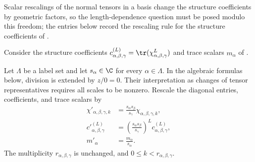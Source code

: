 Scalar rescalings of the normal tensors in a basis change the structure
coefficients by geometric factors, so the length-dependence question
must be posed modulo this freedom; the entries below record the
rescaling rule for the structure coefficients of
\cite[Theorem~4.14]{Cirac2016MPDO_arXiv}.

Consider the structure coefficients
$c_{\alpha,\beta,\gamma}^{(L)}=\tr(\chi_{\alpha,\beta,\gamma}^{L})$
and trace scalars $m_\alpha$ of
\cite[Theorem~4.14(ii)]{Cirac2016MPDO_arXiv}.
\begin{definition}
    \label{def:asymex_rescaling}
    \leanok
    Let $\Lambda$ be a label set and let $s_\alpha\in\C$
    for every $\alpha\in\Lambda$. In the algebraic formulas below,
    division is extended by $z/0=0$. Their interpretation as changes
    of tensor representatives requires all scales to be nonzero.
    Rescale the diagonal entries, coefficients, and trace scalars by
    \begin{align}
        \chi'_{\alpha,\beta,\gamma,k}
                  & =\frac{s_\alpha s_\beta}{s_\gamma}
        \chi_{\alpha,\beta,\gamma,k},
        \label{eq:asymex_chi_rescale}                                 \\
        c'{}_{\alpha,\beta,\gamma}^{(L)}
                  & =\left(\frac{s_\alpha s_\beta}{s_\gamma}\right)^L
        c_{\alpha,\beta,\gamma}^{(L)},
        \label{eq:asymex_c_rescale}                                   \\
        m'_\alpha & =\frac{m_\alpha}{s_\alpha}.
        \label{eq:asymex_m_rescale}
    \end{align}
    The multiplicity $r_{\alpha,\beta,\gamma}$ is unchanged, and
    $0\leq k<r_{\alpha,\beta,\gamma}$.
\end{definition}

